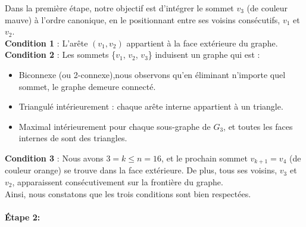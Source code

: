 \documentclass[hidelinks,letterpaper,12pt]{article}
\begin{document}
Dans la première étape, notre objectif est d'intégrer le sommet $v_3$ (de couleur mauve) à l'ordre canonique, en le positionnant entre ses voisins consécutifs, $v_1$ et $v_2$.
\\
\textbf{Condition 1} : L'arête \( (v_1,v_2) \) appartient à la face extérieure du graphe.
\\
\textbf{Condition 2} : Les sommets \{$v_1$, $v_2$, $v_3$\} induisent un graphe qui est :
\begin{itemize}
\item Biconnexe (ou 2-connexe),nous observons qu'en éliminant n'importe quel sommet, le graphe demeure connecté.
\item Triangulé intérieurement : chaque arête interne appartient à un triangle.
\item Maximal intérieurement pour chaque sous-graphe de $G_3$, et toutes les faces internes de sont des triangles.
\end{itemize}
\textbf{Condition 3} : Nous avons $3=k \leq n=16$, et le prochain sommet $v_{k+1}=v_4$ (de couleur orange) se trouve dans la face extérieure. De plus, tous ses voisins, $v_3$ et $v_2$, apparaissent consécutivement sur la frontière du graphe.
\\
Ainsi, nous constatons que les trois conditions sont bien respectées.
\\ \\
\textbf{Étape 2:}
\end{document}
